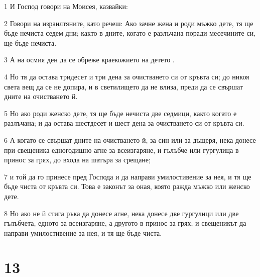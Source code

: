 \par 1 И Господ говори на Моисея, казвайки:
\par 2 Говори на израилтяните, като речеш: Ако зачне жена и роди мъжко дете, тя ще бъде нечиста седем дни; както в дните, когато е разлъчана поради месечините си, ще бъде нечиста.
\par 3 А на осмия ден да се обреже краекожието на детето .
\par 4 Но тя да остава тридесет и три дена за очистването си от кръвта си; до никоя света вещ да се не допира, и в светилището да не влиза, преди да се свършат дните на очистването й.
\par 5 Но ако роди женско дете, тя ще бъде нечиста две седмици, както когато е разлъчана; и да остава шестдесет и шест дена за очистването си от кръвта си.
\par 6 А когато се свършат дните на очистването й, за син или за дъщеря, нека донесе при свещеника едногодишно агне за всеизгаряне, и гълъбче или гургулица в принос за грях, до входа на шатъра за срещане;
\par 7 и той да го принесе пред Господа и да направи умилостивение за нея, и тя ще бъде чиста от кръвта си. Това е законът за оная, която ражда мъжко или женско дете.
\par 8 Но ако не й стига ръка да донесе агне, нека донесе две гургулици или две гълъбчета, едното за всеизгаряне, а другото в принос за грях; и свещеникът да направи умилостивение за нея, и тя ще бъде чиста.

\chapter{13}

